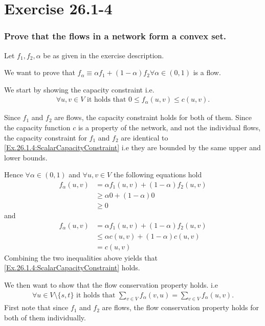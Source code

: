 \section*{Exercise 26.1-4}
\subsubsection*{Prove that the flows in a network form a convex set.}
Let $f_1,f_2,\alpha$ be as given in the exercise description.

We want to prove that $f_{\alpha}\equiv\alpha f_1 + (1- \alpha)f_2 \forall \alpha \in (0,1)$ is a flow.

We start by showing the capacity constraint i.e. 
\begin{align}
\forall u,v \in V \text{ it holds that } 0\leq f_{\alpha}(u,v)\leq c(u,v)\label{Ex.26.1.4:ScalarCapacityConstraint}.
\end{align}

Since $f_1$ and $f_2$ are flows, the capacity constraint holds for both of them. Since the capacity function $c$ is a property of the network, and not the individual flows, the capacity constraint for $f_1$ and $f_2$ are identical to \eqref{Ex.26.1.4:ScalarCapacityConstraint} i.e they are bounded by the same upper and lower bounds.

Hence $\forall \alpha \in (0,1)$ and $\forall u,v \in V$ the following equations hold
\begin{align*}
f_{\alpha}(u,v) &= \alpha f_1(u,v) + (1- \alpha)f_2(u,v)\\
                &\geq \alpha 0 + (1- \alpha)0 \\
								&\geq 0
\end{align*}
and
\begin{align*}
f_{\alpha}(u,v) &= \alpha f_1(u,v) + (1- \alpha)f_2(u,v)\\
                &\leq \alpha c(u,v) + (1- \alpha)c(u,v) \\
								&= c(u,v)
\end{align*}
Combining the two inequalities above yields that \eqref{Ex.26.1.4:ScalarCapacityConstraint} holds.

We then want to show that the flow conservation property holds. i.e
\begin{align}
\forall u \in V\setminus\{s,t\} \text{ it holds that } \sum_{v\in V}f_{\alpha}(v,u) = \sum_{v\in V}f_{\alpha}(u,v)\label{Ex.26.1.4:FlowConservationConstraint}.
\end{align}
First note that since $f_1$ and $f_2$ are flows, the flow conservation property holds for both of them individually.

